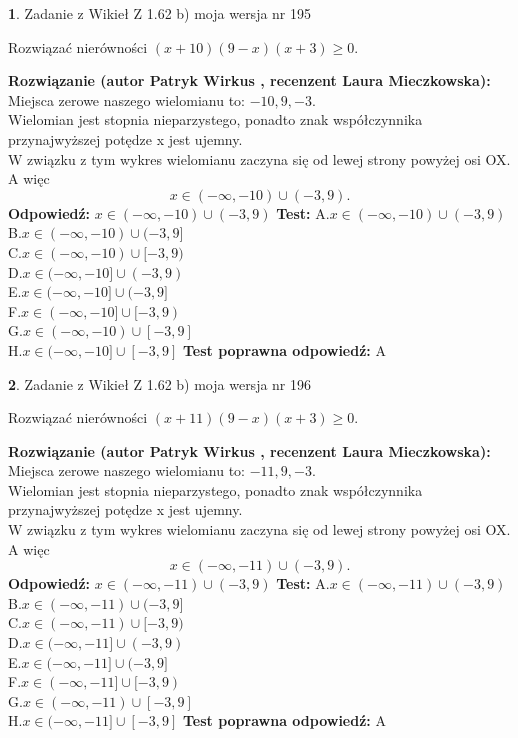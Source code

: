 \documentclass[12pt, a4paper]{article}
\theoremstyle{definition} %
\newtheorem{zad}{}
\newcommand{\zadStart}[1]{\begin{zad}#1\newline}
\newcommand{\zadStop}{\end{zad}}
\newcommand{\rozwStart}[2]{\noindent \textbf{Rozwiązanie (autor #1 , recenzent #2): }\newline}
\newcommand{\rozwStop}{\newline}
\newcommand{\odpStart}{\noindent \textbf{Odpowiedź:}\newline}
\newcommand{\odpStop}{\newline}
\newcommand{\testStart}{\noindent \textbf{Test:}\newline}
\newcommand{\testStop}{\newline}
\newcommand{\kluczStart}{\noindent \textbf{Test poprawna odpowiedź:}\newline}
\newcommand{\kluczStop}{\newline}
\begin{document}
\zadStart{Zadanie z Wikieł Z 1.62 b) moja wersja nr 195}

Rozwiązać nierówności $(x+10)(9-x)(x+3)\ge0$.
\zadStop
\rozwStart{Patryk Wirkus}{Laura Mieczkowska}
Miejsca zerowe naszego wielomianu to: $-10, 9, -3$.\\
Wielomian jest stopnia nieparzystego, ponadto znak współczynnika przy\linebreak najwyższej potędze x jest ujemny.\\ W związku z tym wykres wielomianu zaczyna się od lewej strony powyżej osi OX. A więc $$x \in (-\infty,-10) \cup (-3,9).$$
\rozwStop
\odpStart
$x \in (-\infty,-10) \cup (-3,9)$
\odpStop
\testStart
A.$x \in (-\infty,-10) \cup (-3,9)$\\
B.$x \in (-\infty,-10) \cup (-3,9]$\\
C.$x \in (-\infty,-10) \cup [-3,9)$\\
D.$x \in (-\infty,-10] \cup (-3,9)$\\
E.$x \in (-\infty,-10] \cup (-3,9]$\\
F.$x \in (-\infty,-10] \cup [-3,9)$\\
G.$x \in (-\infty,-10) \cup [-3,9]$\\
H.$x \in (-\infty,-10] \cup [-3,9]$
\testStop
\kluczStart
A
\kluczStop



\zadStart{Zadanie z Wikieł Z 1.62 b) moja wersja nr 196}

Rozwiązać nierówności $(x+11)(9-x)(x+3)\ge0$.
\zadStop
\rozwStart{Patryk Wirkus}{Laura Mieczkowska}
Miejsca zerowe naszego wielomianu to: $-11, 9, -3$.\\
Wielomian jest stopnia nieparzystego, ponadto znak współczynnika przy\linebreak najwyższej potędze x jest ujemny.\\ W związku z tym wykres wielomianu zaczyna się od lewej strony powyżej osi OX. A więc $$x \in (-\infty,-11) \cup (-3,9).$$
\rozwStop
\odpStart
$x \in (-\infty,-11) \cup (-3,9)$
\odpStop
\testStart
A.$x \in (-\infty,-11) \cup (-3,9)$\\
B.$x \in (-\infty,-11) \cup (-3,9]$\\
C.$x \in (-\infty,-11) \cup [-3,9)$\\
D.$x \in (-\infty,-11] \cup (-3,9)$\\
E.$x \in (-\infty,-11] \cup (-3,9]$\\
F.$x \in (-\infty,-11] \cup [-3,9)$\\
G.$x \in (-\infty,-11) \cup [-3,9]$\\
H.$x \in (-\infty,-11] \cup [-3,9]$
\testStop
\kluczStart
A
\kluczStop
\end{document}
